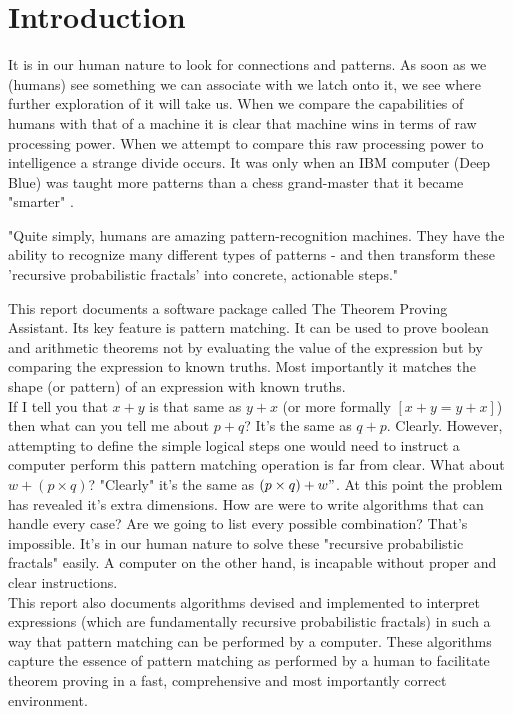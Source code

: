 \documentclass{article}
\newcommand{\enterProblemHeader}[1]{
\nobreak\extramarks{#1}{#1}\nobreak
\nobreak\extramarks{#1}{#1}\nobreak
}
\newcommand{\exitProblemHeader}[1]{
\nobreak\extramarks{#1}{#1 continued on next page\ldots}\nobreak
\nobreak\extramarks{#1}{}\nobreak
}
\newcounter{homeworkProblemCounter} %
\newcommand{\homeworkProblemName}{}
\newenvironment{homeworkProblem}[1][
 \arabic{homeworkProblemCounter}]{ %
\stepcounter{homeworkProblemCounter} %
\renewcommand{\homeworkProblemName}{#1} %
\section{\homeworkProblemName} %
\enterProblemHeader{} %
}{
\exitProblemHeader{} %
}
\begin{document}
\begin{homeworkProblem}[Introduction]

It is in our human nature to look for connections and patterns. As soon as we (humans) see something we can associate with we latch onto it, we see where further exploration of it will take us. When we compare the capabilities of humans with that of a machine it is clear that machine wins in terms of raw processing power. When we attempt to compare this raw processing power to intelligence a strange divide occurs. It was only when an IBM computer (Deep Blue) was taught more patterns than a chess grand-master that it became "smarter" \cite{DEEPBLUE:1997}.

\begin{displayquote}
"Quite simply, humans are amazing pattern-recognition machines. They have the ability to recognize many different types of patterns - and then transform these  'recursive probabilistic fractals' into concrete, actionable steps."\cite{PROBFRACT}
\end{displayquote}

This report documents a software package called The Theorem Proving Assistant. Its key feature is pattern matching. It can be used to prove boolean and arithmetic theorems not by evaluating the value of the expression but by comparing the expression to known truths. Most importantly it matches the shape (or pattern) of an expression with known truths.\\

If I tell you that $x+y$ is that same as $y+x$ (or more formally $[x + y = y + x]$) then what can you tell me about $p + q$? It's the same as $q + p$. Clearly. However, attempting to define the simple logical steps one would need to instruct a computer perform this pattern matching operation is far from clear. What about $w+(p \times q)$? "Clearly" it's the same as $(p \times q)+w"$. At this point the problem has revealed it's extra dimensions. How are were to write algorithms that can handle every case? Are we going to list every possible combination? That's impossible. It's in our human nature to solve these "recursive probabilistic fractals" easily. A computer on the other hand, is incapable without proper and clear instructions.\\

This report also documents algorithms devised and implemented to interpret  expressions (which are fundamentally recursive probabilistic fractals) in such a way that pattern matching can be performed by a computer. These algorithms capture the essence of pattern matching as performed by a human to facilitate theorem proving in a fast, comprehensive and most importantly correct environment.

\newpage
\end{homeworkProblem}
\end{document}
